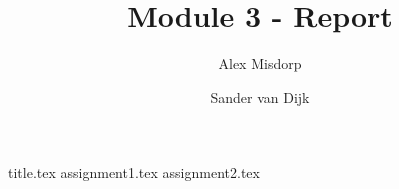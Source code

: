 \documentclass[final]{scrreprt} %
\title{Module 3 - Report}
\author{Alex {Misdorp} \and Sander {van Dijk}}
\begin{document}

{title.tex}
\newpage
{}
{assignment1.tex}
{assignment2.tex}
\newpage
{}

\printbibliography
\end{document}
